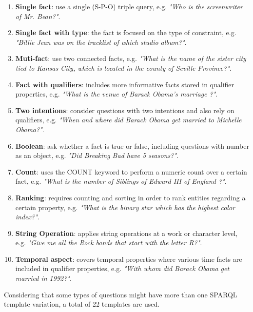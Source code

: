\begin{enumerate}
    \item \textbf{Single fact}: use a single (S-P-O) triple query, e.g. \textit{"Who is the 
    screenwriter of Mr. Bean?"}.
    \item \textbf{Single fact with type}: the fact is focused on the type of constraint, e.g. 
    \textit{"Billie Jean was on the tracklist of which studio album?"}.
    \item \textbf{Muti-fact}: use two connected facts, e.g. \textit{"What is the name of the 
    sister city tied to Kansas City, which is located in the county of Seville Province?"}.
    \item \textbf{Fact with qualifiers}: includes more informative facts stored in qualifier 
    properties, e.g. \textit{"What is the venue of Barack Obama’s marriage ?"}.
    \item \textbf{Two intentions}: consider questions with two intentions and also rely on 
    qualifiers, e.g. \textit{"When and where did Barack Obama get married to Michelle Obama?"}.
    \item \textbf{Boolean}: ask whether a fact is true or false, including questions with 
    number as an object, e.g. \textit{"Did Breaking Bad have 5 seasons?"}.
    \item \textbf{Count}: uses the COUNT keyword to perform a numeric count over a certain fact, 
    e.g. \textit{"What is the number of Siblings of Edward III of England ?"}.
    \item \textbf{Ranking}: requires counting and sorting in order to rank entities regarding a 
    certain property, e.g. \textit{"What is the binary star which has the highest color index?"}.
    \item \textbf{String Operation}: applies string operations at a work or character level, 
    e.g. \textit{"Give me all the Rock bands that start with the letter R?"}.
    \item \textbf{Temporal aspect}: covers temporal properties where various time facts are 
    included in qualifier properties, e.g. \textit{"With whom did Barack Obama get married in 1992?"}.
\end{enumerate}

Considering that some types of questions might have more than one SPARQL template variation, a 
total of 22 templates are used. 

